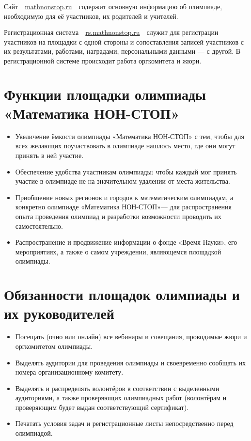 \documentclass[a4paper,12pt]{article}
\newcommand{\mns}{«Математика НОН-СТОП»\xspace}
\begin{document}
Сайт\ \ \url{mathnonstop.ru}\ \ содержит основную информацию об олимпиаде, необходимую для её участников, их родителей и учителей.

Регистрационная система\ \ \url{rs.mathnonstop.ru}\ \ служит для регистрации участников на площадки с одной стороны и сопоставления записей участников с их результатами, работами, наградами, персональными данными — с другой. В регистрационной системе происходит работа оргкомитета и жюри.

\section{Функции площадки олимпиады \mns}

\begin{itemize}
	\item Увеличение ёмкости олимпиады \mns с тем, чтобы для всех желающих поучаствовать в олимпиаде нашлось место, где они могут принять в ней участие.
	\item Обеспечение удобства участникам олимпиады: чтобы каждый мог принять участие в олимпиаде не на значительном удалении от места жительства.
	\item Приобщение новых регионов и городов к математическим олимпиадам, а конкретно олимпиаде \mns — для распространения опыта проведения олимпиад и разработки возможности проводить их самостоятельно.
	\item Распространение и продвижение информации о фонде «Время Науки», его мероприятиях, а также о самом учреждении, являющемся площадкой олимпиады.
\end{itemize}

\section{Обязанности площадок олимпиады и их руководителей}

\begin{itemize}
	\item Посещать (очно или онлайн) все вебинары и совещания, проводимые жюри и оргкомитетом олимпиады.
	\item Выделять аудитории для проведения олимпиады и своевременно сообщать их номера организационному комитету.
	\item Выделять и распределять волонтёров в соответствии с выделенными аудиториями, а также проверяющих олимпиадных работ (волонтёрам и проверяющим будет выдан соответствующий сертификат).
	\item Печатать условия задач и регистрационные листы непосредственно перед олимпиадой.
\end{itemize}
\end{document}
